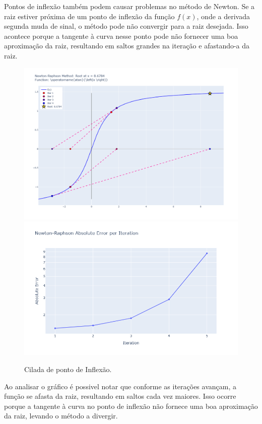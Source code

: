 Pontos de inflexão também podem causar problemas no método de Newton. Se a raiz estiver próxima de um ponto de inflexão da função \(f(x)\), onde a derivada segunda muda de sinal, o método pode não convergir para a raiz desejada. Isso acontece porque a tangente à curva nesse ponto pode não fornecer uma boa aproximação da raiz, resultando em saltos grandes na iteração e afastando-a da raiz.
\begin{figure}[H]
    \centering 
    \includegraphics[width=1\textwidth]{Imagens/pitfalls/04/arctg.png}
    \includegraphics[width=1\textwidth]{Imagens/pitfalls/04/err_arctg.png}
    \caption{Cilada de ponto de Inflexão.}
    \label{fig:ciladaPontoInflexao}
\end{figure}
Ao analisar o gráfico é possivel notar que conforme as iterações avançam, a função se afasta da raiz, resultando em saltos cada vez maiores. Isso ocorre porque a tangente à curva no ponto de inflexão não fornece uma boa aproximação da raiz, levando o método a divergir.

